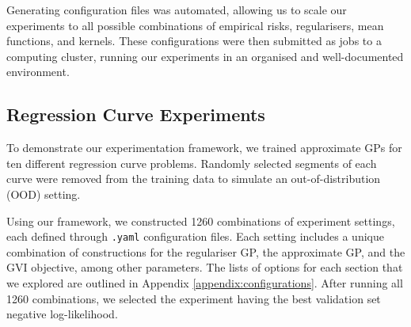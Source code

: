 \documentclass{article}
\def\code#1{\texttt{#1}}
\numberwithin{equation}{section}
\begin{document}
Generating configuration files was automated, allowing us to scale our experiments to all possible combinations of empirical risks, regularisers, mean functions, and kernels. 
These configurations were then submitted as jobs to a computing cluster, running our experiments in an organised and well-documented environment.

\subsection{Regression Curve Experiments}
To demonstrate our experimentation framework, we trained approximate GPs for ten different regression curve problems. 
Randomly selected segments of each curve were removed from the training data to simulate an out-of-distribution (OOD) setting.

Using our framework, we constructed 1260 combinations of experiment settings, each defined through \code{.yaml} configuration files. 
Each setting includes a unique combination of constructions for the regulariser GP, the approximate GP, and the GVI objective, among other parameters. 
The lists of options for each section that we explored are outlined in Appendix \ref{appendix:configurations}.
After running all 1260 combinations, we selected the experiment having the best validation set negative log-likelihood. 
\end{document}
